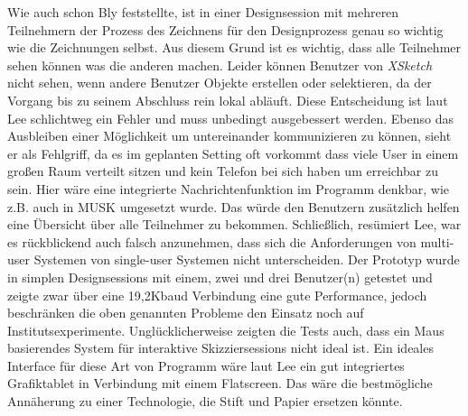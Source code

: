 Wie auch schon Bly feststellte, ist in einer Designsession mit mehreren Teilnehmern der Prozess des Zeichnens für den Designprozess genau so wichtig wie die Zeichnungen selbst. \citep{Bly:1988:UDS:62266.62286} Aus diesem Grund ist es wichtig, dass alle Teilnehmer sehen können was die anderen machen. Leider können Benutzer von \emph{XSketch} nicht sehen, wenn andere Benutzer Objekte erstellen oder selektieren, da der Vorgang bis zu seinem Abschluss rein lokal abläuft. Diese Entscheidung ist laut Lee schlichtweg ein Fehler und muss unbedingt ausgebessert werden. Ebenso das Ausbleiben einer Möglichkeit um untereinander kommunizieren zu können, sieht er als Fehlgriff, da es im geplanten Setting oft vorkommt dass viele User in einem großen Raum verteilt sitzen und kein Telefon bei sich haben um erreichbar zu sein. Hier wäre eine integrierte Nachrichtenfunktion im Programm denkbar, wie z.B. auch in MUSK \citep{Crampton:1987} umgesetzt wurde. Das würde den Benutzern zusätzlich helfen eine Übersicht über alle Teilnehmer zu bekommen. 
Schließlich, resümiert Lee, war es rückblickend auch falsch anzunehmen, dass sich die Anforderungen von multi-user Systemen von single-user Systemen nicht unterscheiden. Der Prototyp wurde in simplen Designsessions mit einem, zwei und drei Benutzer(n) getestet und zeigte zwar über eine 19,2Kbaud Verbindung eine gute Performance, jedoch beschränken die oben genannten Probleme den Einsatz noch auf Institutsexperimente.
Unglücklicherweise zeigten die Tests auch, dass ein Maus basierendes System für interaktive Skizziersessions nicht ideal ist. Ein ideales Interface für diese Art von Programm wäre laut Lee ein gut integriertes Grafiktablet in Verbindung mit einem Flatscreen. Das wäre die bestmögliche Annäherung zu einer Technologie, die Stift und Papier ersetzen könnte.


